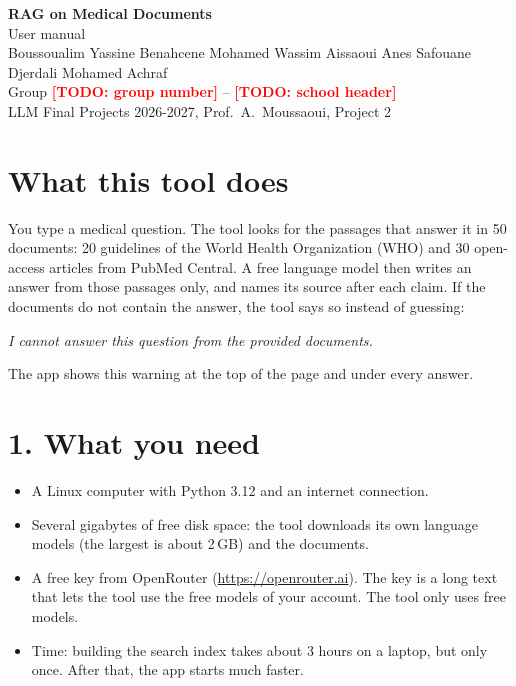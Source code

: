 \documentclass[11pt,a4paper]{article}
\newcommand{\TODO}[1]{\textcolor{red}{\textbf{[TODO: #1]}}}
\begin{document}
\begin{center}
  {\LARGE\bfseries RAG on Medical Documents}\\[0.3em]
  {\Large User manual}\\[0.6em]
  Boussoualim Yassine \quad Benahcene Mohamed Wassim \quad Aissaoui Anes Safouane \quad Djerdali Mohamed Achraf\\[0.2em]
  Group \TODO{group number} \quad -- \quad \TODO{school header}\\
  LLM Final Projects 2026-2027, Prof.\ A.\ Moussaoui, Project 2
\end{center}

\section*{What this tool does}

You type a medical question. The tool looks for the passages that answer it in 50 documents: 20
guidelines of the World Health Organization (WHO) and 30 open-access articles from PubMed Central.
A free language model then writes an answer from those passages only, and names its source after
each claim. If the documents do not contain the answer, the tool says so instead of guessing:

\begin{center}
\emph{I cannot answer this question from the provided documents.}
\end{center}

\noindent{}

The app shows this warning at the top of the page and under every answer.

\section*{1. What you need}

\begin{itemize}[leftmargin=1.5em]
  \item A Linux computer with Python 3.12 and an internet connection.
  \item Several gigabytes of free disk space: the tool downloads its own language models (the largest is about 2\,GB) and the documents.
  \item A free key from OpenRouter (\url{https://openrouter.ai}). The key is a long text that lets
        the tool use the free models of your account. The tool only uses free models.
  \item Time: building the search index takes about 3 hours on a laptop, but only once. After that,
        the app starts much faster.
\end{itemize}
\end{document}

